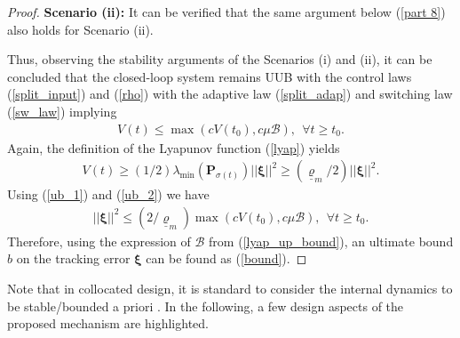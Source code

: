 \begin{proof}
	\textbf{Scenario (ii):} It can be verified that the same argument below (\ref{part 8}) also holds for Scenario (ii). 
	
	Thus, observing the stability arguments of the Scenarios (i) and (ii), it can be concluded that the closed-loop system remains UUB with the control laws (\ref{split_input}) and (\ref{rho}) with the adaptive law (\ref{split_adap}) and switching law (\ref{sw_law}) implying
	\begin{align}
	V(t) \leq \max \left( c V(t_0), c\mu \mathcal{B} \right), ~~\forall t\geq t_0. \label{ub_1}
	\end{align}
	Again, the definition of the Lyapunov function (\ref{lyap}) yields
	\begin{align}
	V(t) \geq ({1}/{2}) \lambda_{\min} (\mathbf P_{\sigma(t)}) || \boldsymbol \xi || ^2 \geq \left({\underline{\varrho}_m }/{2}\right) || \boldsymbol \xi || ^2. \label{ub_2}
	\end{align}
	Using (\ref{ub_1}) and (\ref{ub_2}) we have
	\begin{align}
	|| \boldsymbol \xi || ^2 \leq \left({2}/{\underline{\varrho}_m }\right) \max \left( c V(t_0), c \mu \mathcal{B} \right), ~~\forall t\geq t_0. \label{ub_3}
	\end{align}
	Therefore, using the expression of $\mathcal{B}$ from (\ref{lyap_up_bound}), an ultimate bound $b$ on the tracking error $\boldsymbol \xi$ can be found as (\ref{bound}).
\end{proof}
Note that in collocated design, it is standard to consider the internal dynamics to be stable/bounded a priori \cite{shkolnik2008high,spong1994partial}. In the following, a few design aspects of the proposed mechanism are highlighted. 



